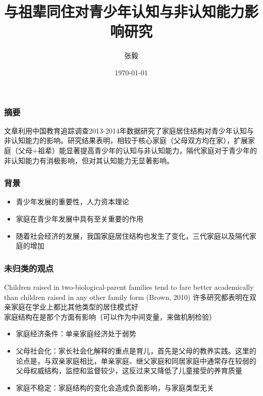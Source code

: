 \documentclass{beamer}
\title[三代同住、隔代同住]{与祖辈同住对青少年认知与非认知能力影响研究}
\author{张毅}
\date{\today}
\begin{document}
\frame{\titlepage}


\begin{frame}
\frametitle{摘要}
文章利用中国教育追踪调查2013-2014年数据研究了家庭居住结构对青少年认知与非认知能力的影响。研究结果表明，相较于核心家庭（父母双方均在家），扩展家庭（父母+祖辈）能显著提高青少年的认知与非认知能力，隔代家庭对于青少年的非认知能力有消极影响，但对其认知能力无显著影响。
\end{frame}

\begin{frame}
	\frametitle{背景}

	\begin{itemize}
	\item 青少年发展的重要性，人力资本理论
	\item 家庭在青少年发展中具有至关重要的作用
	\item 随着社会经济的发展，我国家庭居住结构也发生了变化，三代家庭以及隔代家庭的增加
	\end{itemize}
\end{frame}

\begin{frame}
	\frametitle{未归类的观点}
Children raised in two-biological-parent families tend to fare better academically than children raised in any other family form (Brown, 2010) 许多研究都表明在双亲家庭在学业上都比其他类型的居住模式好
\\ 家庭结构在是那个方面有影响（可以作为中间变量，来做机制检验）
\begin{itemize}
	\item 家庭经济条件：单亲家庭经济处于弱势
	\item 父母社会化：家长社会化解释的重点是育儿，首先是父母的教养实践。这里的论点是，与双亲家庭相比，单亲家庭、继父家庭和同居家庭中通常存在较弱的父母权威结构，监控和监督较少，这反过来又降低了儿童接受的养育质量
	\item 家庭不稳定：家庭结构的变化会造成负面影响，与家庭类型无关
\end{itemize}




\end{frame}
\end{document}
